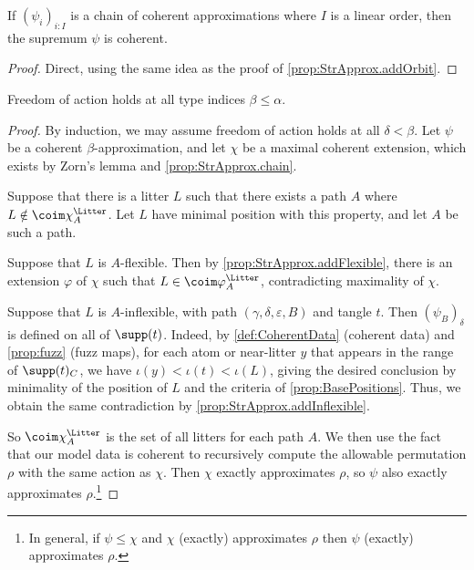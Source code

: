 \begin{proposition}
  \label{prop:StrApprox.chain}
  \leanok
  If \( (\psi_i)_{i : I} \) is a chain of coherent approximations where \( I \) is a linear order, then the supremum \( \psi \) is coherent.
\end{proposition}
\begin{proof}
  \leanok
  Direct, using the same idea as the proof of \cref{prop:StrApprox.addOrbit}.
\end{proof}
\begin{theorem}
  \label{thm:StrApprox.foa}
  \leanok
  Freedom of action holds at all type indices \( \beta \leq \alpha \).
\end{theorem}
\begin{proof}
  \leanok
  By induction, we may assume freedom of action holds at all \( \delta < \beta \).
  Let \( \psi \) be a coherent \( \beta \)-approximation, and let \( \chi \) be a maximal coherent extension, which exists by Zorn's lemma and \cref{prop:StrApprox.chain}.

  Suppose that there is a litter \( L \) such that there exists a path \( A \) where \( L \notin \coim \chi_A^\Litter \).
  Let \( L \) have minimal position with this property, and let \( A \) be such a path.

  Suppose that \( L \) is \( A \)-flexible.
  Then by \cref{prop:StrApprox.addFlexible}, there is an extension \( \varphi \) of \( \chi \) such that \( L \in \coim \varphi_A^\Litter \), contradicting maximality of \( \chi \).

  Suppose that \( L \) is \( A \)-inflexible, with path \( (\gamma,\delta,\varepsilon,B) \) and tangle \( t \).
  Then \( (\psi_B)_\delta \) is defined on all of \( \supp(t) \).
  Indeed, by \cref{def:CoherentData} (coherent data) and \cref{prop:fuzz} (fuzz maps), for each atom or near-litter \( y \) that appears in the range of \( \supp(t)_C \), we have \( \iota(y) < \iota(t) < \iota(L) \), giving the desired conclusion by minimality of the position of \( L \) and the criteria of \cref{prop:BasePositions}.
  Thus, we obtain the same contradiction by \cref{prop:StrApprox.addInflexible}.

  So \( \coim \chi_A^\Litter \) is the set of all litters for each path \( A \).
  We then use the fact that our model data is coherent to recursively compute the allowable permutation \( \rho \) with the same action as \( \chi \).
  Then \( \chi \) exactly approximates \( \rho \), so \( \psi \) also exactly approximates \( \rho \).\footnote{In general, if \( \psi \leq \chi \) and \( \chi \) (exactly) approximates \( \rho \) then \( \psi \) (exactly) approximates \( \rho \).}
\end{proof}

